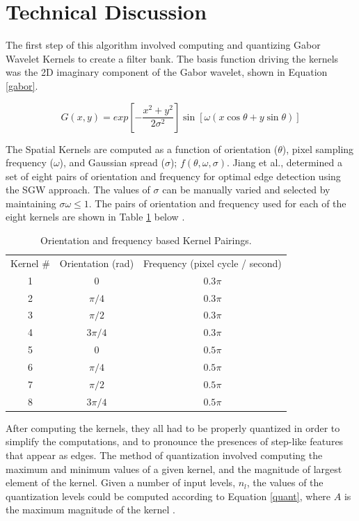 \documentclass[./rarnold_final_project.tex]{subfiles}
\begin{document}
\clearpage

\section{Technical Discussion}

\noindent The first step of this algorithm involved computing and quantizing Gabor Wavelet Kernels to create a filter bank.  The basis function driving the kernels was the 2D imaginary component of the Gabor wavelet, shown in Equation \eqref{gabor}.  

\begin{equation}
\label{gabor}
G(x,y) = exp\left[ - \frac{x^2 + y^2}{2\sigma^2}\right ] \sin [\omega(x\cos\theta + y\sin\theta)]
\end{equation}

\noindent The Spatial Kernels are computed as a function of orientation ($\theta$), pixel sampling frequency ($\omega$), and Gaussian spread ($\sigma$); $f(\theta, \omega, \sigma)$.  Jiang et al., determined a set of eight pairs of orientation and frequency for optimal edge detection using the SGW approach.  The values of $\sigma$ can be manually varied and selected by maintaining $\sigma\omega \leq 1$. The pairs of orientation and frequency used for each of the eight kernels are shown in Table \ref{pairs} below \cite{main}.

\begin{table}[htbp]
\centering
\caption{Orientation and frequency based Kernel Pairings.}
\label{pairs}
\begin{tabular}{|c|c|c|}
\hline
Kernel \# & Orientation (rad)& Frequency (pixel cycle / second)\\ \hhline{|=|=|=|}
1& 0 & $0.3\pi$\\ \hline
2& $\pi/4$ & $0.3\pi$\\ \hline
3& $\pi/2$ & $0.3\pi$\\ \hline
4& $3\pi/4$ & $0.3\pi$\\ \hline
5& 0 & $0.5\pi$\\ \hline
6& $\pi/4$ & $0.5\pi$\\ \hline
7& $\pi/2$ & $0.5\pi$\\ \hline
8& $3\pi/4$ & $0.5\pi$\\ \hline
\end{tabular}
\end{table}	

\noindent After computing the kernels, they all had to be properly quantized in order to simplify the computations, and to pronounce the presences of step-like features that appear as edges.  The method of quantization involved computing the maximum and minimum values of a given kernel, and the magnitude of largest element of the kernel.  Given a number of input levels, $n_l$, the values of the quantization levels could be computed according to Equation \eqref{quant}, where $A$ is the maximum magnitude of the kernel \cite{main}.
\end{document}
